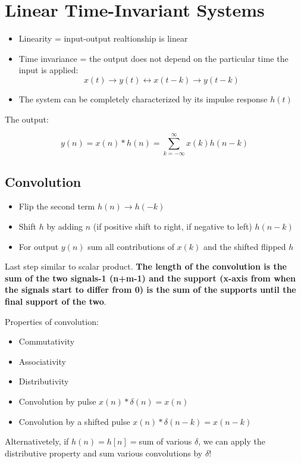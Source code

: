 
\section{Linear Time-Invariant Systems}
\begin{itemize}
    \item Linearity = input-output realtionship is linear
    \item Time invariance = the output does not depend on the particular time the input is applied:
    $$x(t)\rightarrow y(t)\leftrightarrow x(t-k)\rightarrow y(t-k)$$
    \item The system can be completely characterized by its impulse response $h(t)$
\end{itemize}

The output:
\begin{LARGE}
    $$
    y(n)=x(n)*h(n)=\sum_{k=-\infty}^\infty x(k)h(n-k)
    $$
\end{LARGE}

\subsection{Convolution}
\begin{itemize}
    \item Flip the second term $h(n)\rightarrow h(-k)$
    \item Shift $h$ by adding $n$ (if positive shift to right, if negative to left) $h(n-k)$
    \item For output $y(n)$ sum all contributions of $x(k)$ and the shifted flipped $h$
\end{itemize}
Last step similar to scalar product. \textbf{The length of the convolution is the sum of the two signals-1 (n+m-1) and the support (x-axis from when the signals start to differ from 0) is the sum of the supports until the final support of the two}.

Properties of convolution:
\begin{itemize}
    \item Commutativity
    \item Associativity
    \item Distributivity
    \item Convolution by pulse $x(n)*\delta(n)=x(n)$
    \item Convolution by a shifted pulse $x(n)*\delta(n-k)=x(n-k)$
\end{itemize}

Alternativetely, if $h(n)=h[n]=$sum of various $\delta$, we can apply the distributive property and sum various convolutions by $\delta$!

